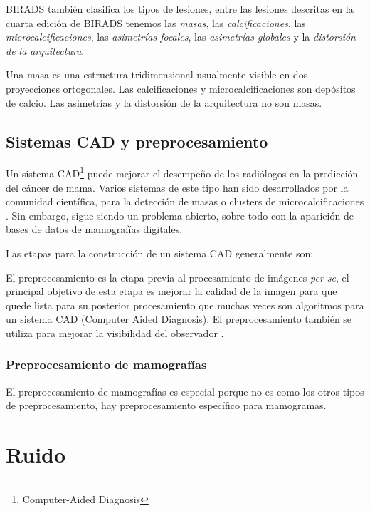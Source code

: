 BIRADS también clasifica los tipos de lesiones, entre las lesiones descritas en
la cuarta edición de BIRADS tenemos las \textit{masas}, las
\textit{calcificaciones}, las \textit{microcalcificaciones}, las
\textit{asimetrías focales}, las \textit{asimetrías globales} y la
\textit{distorsión de la arquitectura}. 

Una masa es una estructura tridimensional usualmente visible en dos
proyecciones ortogonales. Las calcificaciones y microcalcificaciones son
depósitos de calcio. Las asimetrías y la distorsión de la arquitectura no son
masas.

\subsection{Sistemas CAD y preprocesamiento}

Un sistema CAD\footnote{Computer-Aided Diagnosis} puede mejorar el desempeño de
los radiólogos en la predicción del cáncer de mama. Varios sistemas de este
tipo han sido desarrollados por la comunidad científica, para la detección de
masas \cite{bellotti2006completely} o clusters de microcalcificaciones
\cite{yu2000cad}. Sin embargo, sigue siendo un problema abierto, sobre todo con
la aparición de bases de datos de mamografías digitales. 

Las etapas para la construcción de un sistema CAD generalmente son:

\shorthandoff{>} %
    
\shorthandon{>} 

El preprocesamiento es la etapa previa al procesamiento de imágenes \textit{per
se}, el principal objetivo de esta etapa es mejorar la calidad de la imagen
para que quede lista para su posterior procesamiento \cite{ponraj2011survey}
que muchas veces son algoritmos para un sistema CAD (Computer Aided Diagnosis).
El preprocesamiento también se utiliza para mejorar la visibilidad del
observador \cite{rahmati2010new}. 

\subsubsection{Preprocesamiento de mamografías}
El preprocesamiento de mamografías es especial porque no es como los otros tipos
de preprocesamiento, hay preprocesamiento específico para mamogramas.

\section{Ruido}

